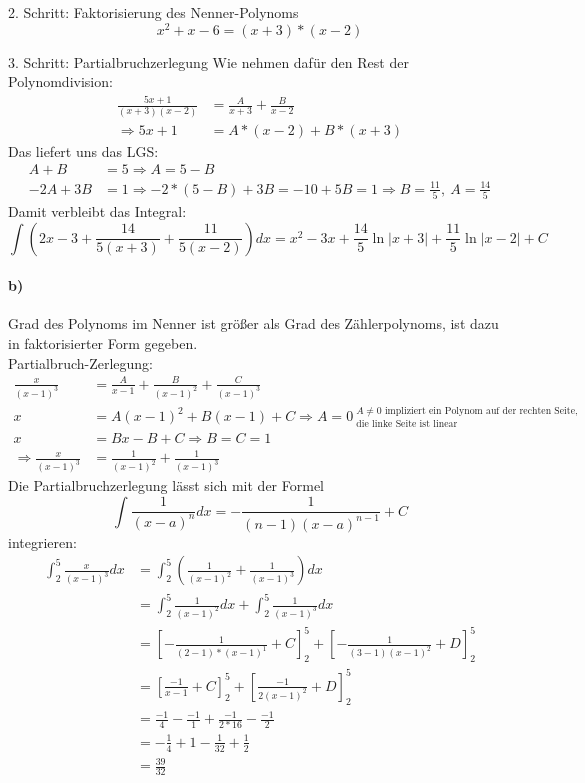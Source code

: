 \documentclass[10pt]{article}
\begin{document}
%
%
\par{2. Schritt:} Faktorisierung des Nenner-Polynoms
\[
	x^2 + x -6 = (x + 3) * (x - 2)
\]
\par{3. Schritt:} Partialbruchzerlegung
Wie nehmen dafür den Rest der Polynomdivision:
\begin{align*}
	\frac{5x + 1}{(x+3)(x-2)} 
	&= \frac{A}{x+3} + \frac{B}{x-2} \\
	\Rightarrow
	5x + 1 
	&= A * (x-2) + B * (x+3)
\end{align*}
Das liefert uns das LGS:
\begin{align*}
	A + B &= 5
	\Rightarrow A = 5-B
	\\
	-2A + 3B &= 1
	\Rightarrow -2 * (5 - B) + 3B = -10 + 5B = 1 
	\Rightarrow B = \frac{11}{5}, \ A = \frac{14}{5}
\end{align*}
Damit verbleibt das Integral:
\[
	\int \left( 2x - 3 + \frac{14}{5(x+3)} + \frac{11}{5(x-2)} \right) dx
	=
	x^2 - 3x + \frac{14}{5} \ln\vert x+3 \vert
	+ \frac{11}{5} \ln\vert x-2 \vert + C
\]

\vspace{0.5cm}
\paragraph{b)}
Grad des Polynoms im Nenner ist größer als Grad des Zählerpolynoms, ist dazu
in faktorisierter Form gegeben.\\
Partialbruch-Zerlegung:
\begin{align*}
	\frac{x}{(x-1)^3} 
	&= \frac{A}{x-1} + \frac{B}{(x-1)^2} + \frac{C}{(x-1)^3} \\
	x &= A (x-1)^2 + B (x-1) + C 
	\Rightarrow A = 0 \
	^\text{$A\neq0$ impliziert ein Polynom auf der 
	rechten Seite,}
	_\text{die linke Seite ist linear}\\
	x &= Bx - B + C 
	\Rightarrow B = C = 1\\
	\Rightarrow
	\frac{x}{(x-1)^3} &= \frac{1}{(x-1)^2} + \frac{1}{(x-1)^3}
\end{align*}
Die Partialbruchzerlegung lässt sich mit der Formel 
\[
	\int \frac{1}{(x-a)^n} dx 
	= - \frac{1}{(n-1)(x-a)^{n-1}} + C
\]
integrieren:
\begin{align*}
	\int_2^5 \frac{x}{(x-1)^3} dx
	&= \int_2^5 \left( \frac{1}{(x-1)^2} + \frac{1}{(x-1)^3} \right) dx
	\\
	&= \int_2^5 \frac{1}{(x-1)^2} dx 
	+ \int_2^5 \frac{1}{(x-1)^3} dx \\
	&= \left[ -\frac{1}{
		(2-1) * (x-1)^1
	} + C \right]_2^5
	+
	\left[ -\frac{1}{(3-1) (x-1)^2} + D \right]_2^5 \\
	&= \left[ \frac{-1}{x-1} + C \right]_2^5 +
	\left[ \frac{-1}{2 (x-1)^2} + D \right]_2^5 \\
	&= \frac{-1}{4} - \frac{-1}{1} + \frac{-1}{2 * 16} -
	\frac{-1}{2} \\
	&= -\frac14 + 1 - \frac1{32} + \frac12 \\
	&= \frac{39}{32}
\end{align*}
\end{document}
